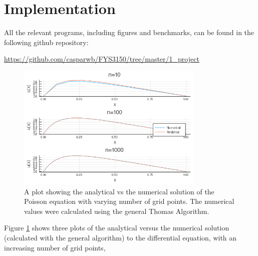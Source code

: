 \documentclass[a4paper,10pt,English]{article}
\begin{document}
\section{Implementation}

All the relevant programs, including figures and benchmarks, can be found in the following github repository:

\begin{center}
    \url{https://github.com/casparwb/FYS3150/tree/master/1_project}
\end{center}

\begin{figure}
    \centering
    \includegraphics[width = 0.8\textwidth]{1bplot.png}
    \caption{A plot showing the analytical vs the numerical solution of the Poisson equation with varying number of grid points. The numerical values were calculated using the general Thomas Algorithm.}
    \label{fig:1b}
\end{figure}

Figure \ref{fig:1b} shows three plots of the analytical versus the numerical solution (calculated with the general algorithm) to the differential equation, with an increasing number of grid points, 
\end{document}
